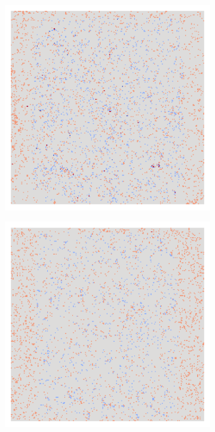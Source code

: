 \begin{figure}[H]
\begin{subfigure}{0.19\linewidth}
        \end{subfigure}\hfill%
        \begin{subfigure}{0.19\linewidth}
            \centering
            \includegraphics[height=1\linewidth]{01-images/05-resultate/uap_resnet18/uap2-resnet18-mri_data-n200-robustificationslevel0.png}
        \end{subfigure}\hfill%
        \begin{subfigure}{0.19\linewidth}
            \centering
            \includegraphics[height=1\linewidth]{01-images/05-resultate/uap_resnet18/uap3-resnet18-mri_data-n200-robustificationslevel0.png}

\end{subfigure}
\end{figure}
